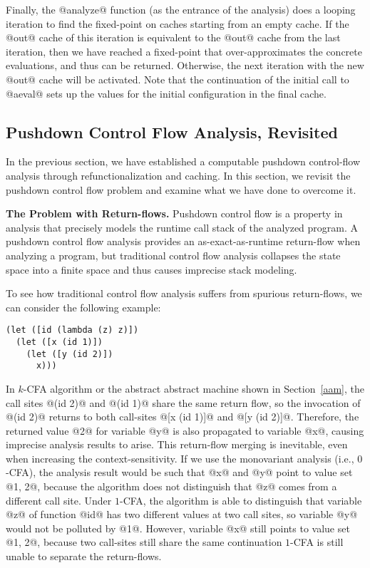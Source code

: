 \documentclass[acmsmall,review,anonymous]{acmart}\settopmatter{printfolios=true,printccs=false,printacmref=false}
\begin{document}
Finally, the @analyze@ function (as the entrance of the analysis) does a looping iteration
to find the fixed-point on caches starting from an empty cache.
If the @out@ cache of this iteration is equivalent to the @out@ cache from the last iteration,
then we have reached a fixed-point that over-approximates the concrete evaluations,
and thus can be returned.
Otherwise, the next iteration with the new @out@ cache will be activated.
Note that the continuation of the initial call to @aeval@ sets up the values for the
initial configuration in the final cache.

\subsection{Pushdown Control Flow Analysis, Revisited} \label{pdcfarevisit}

In the previous section, we have established a computable pushdown control-flow
analysis through refunctionalization and caching. In this section,
we revisit the pushdown control flow problem and examine what we have done to
overcome it.

\textbf{The Problem with Return-flows.}
Pushdown control flow is a property in analysis that precisely models
the runtime call stack of the analyzed program.
A pushdown control flow analysis provides an as-exact-as-runtime return-flow
when analyzing a program, but traditional control flow analysis collapses
the state space into a finite space and thus causes imprecise stack modeling.

To see how traditional control flow analysis suffers from spurious return-flows,
we can consider the following example:

\begin{lstlisting}
(let ([id (lambda (z) z)])
  (let ([x (id 1)])
    (let ([y (id 2)])
      x)))
\end{lstlisting}

In $k$-CFA algorithm or the abstract abstract machine shown in Section~\ref{aam},
the call sites @(id 2)@ and @(id 1)@ share the same return flow,
so the invocation of @(id 2)@ returns to both call-sites @[x (id 1)]@ and @[y (id 2)]@.
Therefore, the returned value @2@ for variable @y@ is also propagated to
variable @x@, causing imprecise analysis results to arise.
This return-flow merging is inevitable, even when increasing the context-sensitivity.
If we use the monovariant analysis (i.e., $0$-CFA), the analysis result would be such that @x@ and @y@ point to value set @{1, 2}@, because the algorithm does not distinguish that
@z@ comes from a different call site.
Under $1$-CFA, the algorithm is able to distinguish that variable @z@ of function
@id@ has two different values at two call sites, so variable @y@
would not be polluted by @1@.
However, variable @x@ still points to value set @{1, 2}@, because two call-sites still share the same continuation $1$-CFA is still unable to separate the return-flows.
\end{document}
